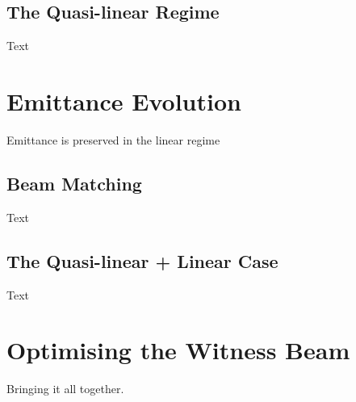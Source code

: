 \subsection{The Quasi-linear Regime}
\label{Sim:QLin}

Text

\section{Emittance Evolution}
\label{Sim:Emitt}

Emittance is preserved in the linear regime

\subsection{Beam Matching}
\label{Sim:Match}

Text

\subsection{The Quasi-linear + Linear Case}
\label{Sim:QLinLin}

Text

\section{Optimising the Witness Beam}
\label{Sim:Opt}

Bringing it all together.

